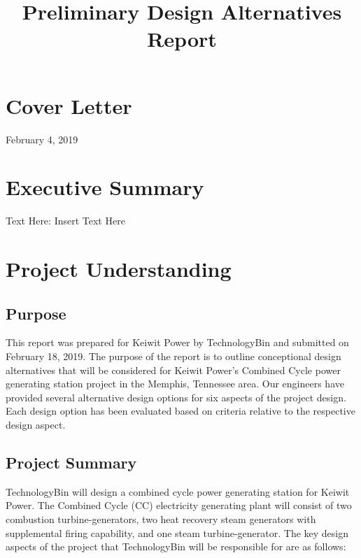 \documentclass{ceri}
\title{Preliminary Design Alternatives Report}
\begin{document}
 
\maketitle
\sloppy     

\section{Cover Letter}
\setlength{\parindent}{0pt}
February 4, 2019
\newline

\newpage
\setlength{\parindent}{8pt}
\section{Executive Summary}
Text Here: Insert Text Here
\section{Project Understanding}

\subsection{Purpose}
This report was prepared for Keiwit Power by TechnologyBin and submitted on February 18, 2019. The purpose of the report is to outline conceptional design alternatives that will be considered for Keiwit Power’s Combined Cycle power generating station project in the Memphis, Tennessee area. Our engineers have provided several alternative design options for six aspects of the project design. Each design option has been evaluated based on criteria relative to the respective design aspect.

\newpage

\subsection{Project Summary}
TechnologyBin will design a combined cycle power generating station for Keiwit Power. The Combined Cycle (CC) electricity generating plant will consist of two combustion turbine-generators, two heat recovery steam generators with supplemental firing capability, and one steam turbine-generator. The key design aspects of the project that TechnologyBin will be responsible for are as follows:
\end{document}
